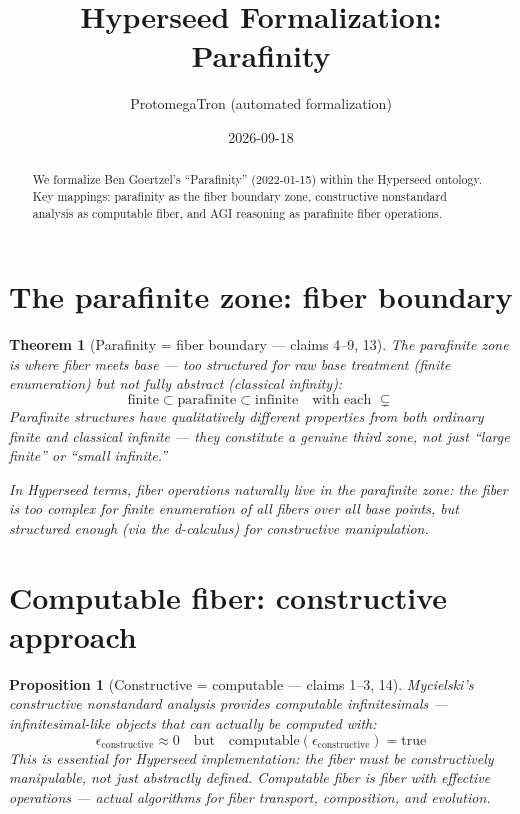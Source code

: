 \documentclass[11pt,a4paper]{article}
\title{Hyperseed Formalization:\\
  Parafinity}
\author{ProtomegaTron (automated formalization)}
\date{2026-09-18}
\newtheorem{theorem}[definition]{Theorem}
\newtheorem{proposition}[definition]{Proposition}
\begin{document}
\maketitle

\begin{abstract}
We formalize Ben Goertzel's ``Parafinity'' (2022-01-15) within the
Hyperseed ontology. Key mappings: parafinity as the fiber boundary zone,
constructive nonstandard analysis as computable fiber, and AGI reasoning
as parafinite fiber operations.
\end{abstract}

\tableofcontents

\section{The parafinite zone: fiber boundary}

\begin{theorem}[Parafinity = fiber boundary --- claims 4--9, 13]
The parafinite zone is where fiber meets base --- too structured for raw
base treatment (finite enumeration) but not fully abstract (classical
infinity):
\[
  \text{finite} \subset \text{parafinite} \subset \text{infinite}
  \quad \text{with each } \subsetneq
\]
Parafinite structures have qualitatively different properties from both
ordinary finite and classical infinite --- they constitute a genuine
third zone, not just ``large finite'' or ``small infinite.''

In Hyperseed terms, fiber operations naturally live in the parafinite
zone: the fiber is too complex for finite enumeration of all fibers over
all base points, but structured enough (via the d-calculus) for
constructive manipulation.
\end{theorem}

\section{Computable fiber: constructive approach}

\begin{proposition}[Constructive = computable --- claims 1--3, 14]
Mycielski's constructive nonstandard analysis provides computable
infinitesimals --- infinitesimal-like objects that can actually be
computed with:
\[
  \epsilon_{\text{constructive}} \approx 0 \quad \text{but} \quad
  \text{computable}(\epsilon_{\text{constructive}}) = \text{true}
\]
This is essential for Hyperseed implementation: the fiber must be
constructively manipulable, not just abstractly defined. Computable
fiber is fiber with effective operations --- actual algorithms for
fiber transport, composition, and evolution.
\end{proposition}
\end{document}
